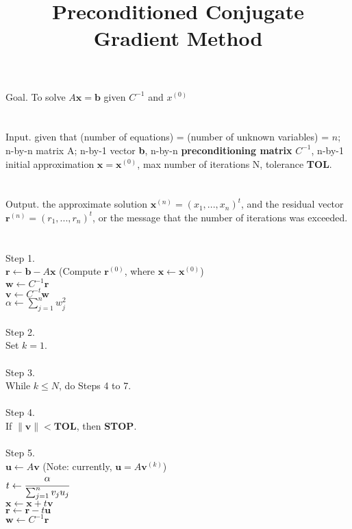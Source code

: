\documentclass[12pt, a4paper]{article}
\title{Preconditioned Conjugate Gradient Method}
\begin{document}
\maketitle{}
Goal. To solve $A\mathbf{x} = \mathbf{b}$ given $C^{-1}$ and $x^{(0)}$
\\
\\
\\
Input. given that (number of equations) = (number of unknown variables) = $n$; n-by-n matrix A; n-by-1 vector \textbf{b}, n-by-n \textbf{preconditioning matrix} $C^{-1}$, n-by-1 initial approximation $\mathbf{x} = \mathbf{x}^{(0)}$, max number of iterations N, tolerance \textbf{TOL}.
\\
\\
\\
Output. the approximate solution $\mathbf{x}^{(n)} = (x_1, ... , x_n)^{t}$, and the residual vector $\mathbf{r}^{(n)} = (r_1, ... , r_n)^{t}$, or the message that the number of iterations was exceeded.
\\
\\
\\
Step 1. 
\\
$\mathbf{r} \gets \mathbf{b} - A\mathbf{x}$ (Compute $\mathbf{r}^{(0)}$, where $\mathbf{x} \gets \mathbf{x}^{(0)}$) \\
$\mathbf{w} \gets C^{-1}\mathbf{r}$ \\
$\mathbf{v} \gets C^{-t}\mathbf{w}$ \\
$\alpha \gets \sum_{j=1}^{n} w_j^{2}$ \\
\\
Step 2. \\
Set $k = 1$. \\
\\
Step 3. \\
While $k \leq N$, do Steps 4 to 7. \\
\\
Step 4. 
\\
If $\|\mathbf{v}\| < \mathbf{TOL}$, then \textbf{STOP}. \\
\\
Step 5.
\\
$\mathbf{u} \gets A\mathbf{v}$ (Note: currently, $\mathbf{u} = A\mathbf{v}^{(k)}$) \\
$t \gets \cfrac{\alpha}{\sum_{j=1}^{n}v_j u_j}$ \\
$\mathbf{x} \gets \mathbf{x} + t\mathbf{v} $ \\
$\mathbf{r} \gets \mathbf{r} - t\mathbf{u}$ \\
$\mathbf{w} \gets C^{-1}\mathbf{r}$ \\
\end{document}
